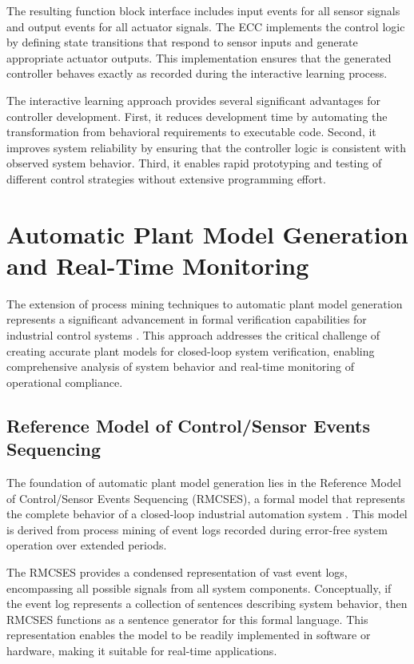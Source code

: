 The resulting function block interface includes input events for all sensor signals and output events for all actuator signals. The ECC implements the control logic by defining state transitions that respond to sensor inputs and generate appropriate actuator outputs. This implementation ensures that the generated controller behaves exactly as recorded during the interactive learning process.


The interactive learning approach provides several significant advantages for controller development. First, it reduces development time by automating the transformation from behavioral requirements to executable code. Second, it improves system reliability by ensuring that the controller logic is consistent with observed system behavior. Third, it enables rapid prototyping and testing of different control strategies without extensive programming effort.

\section{Automatic Plant Model Generation and Real-Time Monitoring}

The extension of process mining techniques to automatic plant model generation represents a significant advancement in formal verification capabilities for industrial control systems \cite{xavier2021plant}. This approach addresses the critical challenge of creating accurate plant models for closed-loop system verification, enabling comprehensive analysis of system behavior and real-time monitoring of operational compliance.

\subsection{Reference Model of Control/Sensor Events Sequencing}

The foundation of automatic plant model generation lies in the Reference Model of Control/Sensor Events Sequencing (RMCSES), a formal model that represents the complete behavior of a closed-loop industrial automation system \cite{vyatkin2008closed}. This model is derived from process mining of event logs recorded during error-free system operation over extended periods.

The RMCSES provides a condensed representation of vast event logs, encompassing all possible signals from all system components. Conceptually, if the event log represents a collection of sentences describing system behavior, then RMCSES functions as a sentence generator for this formal language. This representation enables the model to be readily implemented in software or hardware, making it suitable for real-time applications.

